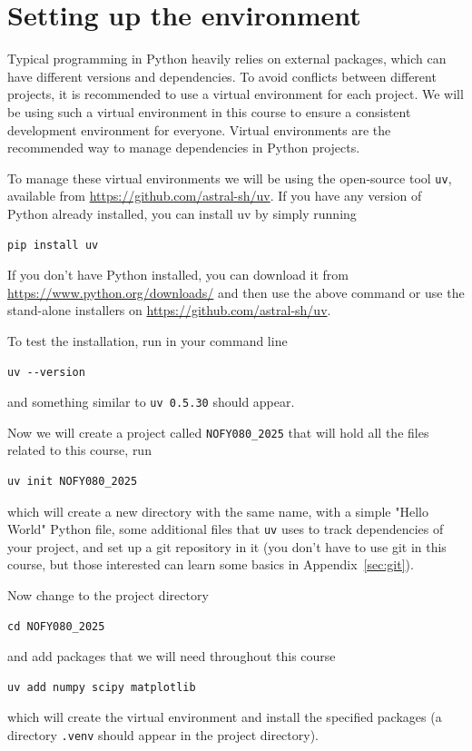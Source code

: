 \newpage
\section{Setting up the environment}
Typical programming in Python heavily relies on external packages, which can have different versions and dependencies. To avoid conflicts between different projects, it is recommended to use a virtual environment for each project. We will be using such a virtual environment in this course to ensure a consistent development environment for everyone. Virtual environments are the recommended way to manage dependencies in Python projects.

To manage these virtual environments we will be using the open-source tool \verb|uv|, available from \url{https://github.com/astral-sh/uv}. If you have any version of Python already installed, you can install uv by simply running
\begin{lstlisting}
pip install uv
\end{lstlisting}
If you don't have Python installed, you can download it from \url{https://www.python.org/downloads/} and then use the above command or use the stand-alone installers on \url{https://github.com/astral-sh/uv}.

To test the installation, run in your command line
\begin{lstlisting}
uv --version
\end{lstlisting}
and something similar to \verb|uv 0.5.30| should appear.

Now we will create a project called \verb|NOFY080_2025| that will hold all the files related to this course, run
\begin{lstlisting}
uv init NOFY080_2025
\end{lstlisting}
which will create a new directory with the same name, with a simple "Hello World" Python file, some additional files that \verb|uv| uses to track dependencies of your project, and set up a git repository in it (you don't have to use git in this course, but those interested can learn some basics in Appendix~\ref{sec:git}).

Now change to the project directory
\begin{lstlisting}
cd NOFY080_2025
\end{lstlisting}
and add packages that we will need throughout this course
\begin{lstlisting}
uv add numpy scipy matplotlib
\end{lstlisting}
which will create the virtual environment and install the specified packages (a directory \verb|.venv| should appear in the project directory).

